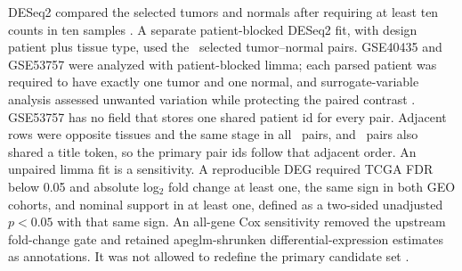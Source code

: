 DESeq2 compared the selected tumors and normals after requiring at least ten counts in ten samples \cite{love_deseq2_2014}. A separate patient-blocked DESeq2 fit, with design patient plus tissue type, used the \PairedPatients\ selected tumor--normal pairs. GSE40435 and GSE53757 were analyzed with patient-blocked limma; each parsed patient was required to have exactly one tumor and one normal, and surrogate-variable analysis assessed unwanted variation while protecting the paired contrast \cite{ritchie_limma_2015,leek_sva_2012}. GSE53757 has no field that stores one shared patient id for every pair. Adjacent rows were opposite tissues and the same stage in all \PairSameStage\ pairs, and \PairSameToken\ pairs also shared a title token, so the primary pair ids follow that adjacent order. An unpaired limma fit is a sensitivity. A reproducible DEG required TCGA FDR below 0.05 and absolute log$_2$ fold change at least one, the same sign in both GEO cohorts, and nominal support in at least one, defined as a two-sided unadjusted $p<0.05$ with that same sign. An all-gene Cox sensitivity removed the upstream fold-change gate and retained apeglm-shrunken differential-expression estimates as annotations. It was not allowed to redefine the primary candidate set \cite{zhu_apeglm_2019}.

